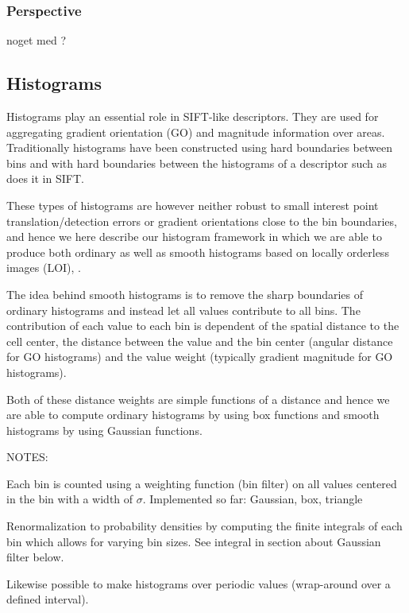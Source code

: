 \documentclass[thesis.tex]{subfiles}
\begin{document}
\subsubsection{Perspective}
noget med ?

\subsection{Histograms}

Histograms play an essential role in SIFT-like descriptors. They are used for aggregating gradient orientation (GO) and magnitude information over areas. Traditionally histograms have been constructed using hard boundaries between bins and with hard boundaries between the histograms of a descriptor such as \citet{lowe2004distinctive} does it in SIFT.

These types of histograms are however neither robust to small interest point translation/detection errors or gradient orientations close to the bin boundaries, and hence we here describe our histogram framework in which we are able to produce both ordinary as well as smooth histograms based on locally orderless images (LOI), \cite{koenderink1999structure}.

The idea behind smooth histograms is to remove the sharp boundaries of ordinary histograms and instead let all values contribute to all bins. The contribution of each value to each bin is dependent of the spatial distance to the cell center, the distance between the value and the bin center (angular distance for GO histograms) and the value weight (typically gradient magnitude for GO histograms).

Both of these distance weights are simple functions of a distance and hence we are able to compute ordinary histograms by using box functions and smooth histograms by using Gaussian functions.

NOTES:

Each bin is counted using a weighting function (bin filter) on all values centered in the bin with a width of $\sigma$.
Implemented so far: Gaussian, box, triangle

Renormalization to probability densities by computing the finite integrals of each bin which allows for varying bin sizes. See integral in section about Gaussian filter below.

Likewise possible to make histograms over periodic values (wrap-around over a defined interval).
\end{document}
